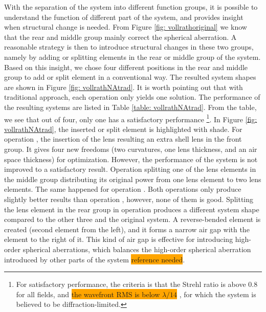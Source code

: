 With the separation of the system into different function groups, it is possible to understand the function of different part of the system, and provides insight when structural change is needed. From Figure \ref{fig: vollrathoriginal} we know that the rear and middle group mainly correct the spherical aberration. A reasonable strategy is then to introduce structural changes in these two groups, namely by adding or splitting elements in the rear or middle group of the system. Based on this insight, we chose four different positions in the rear and middle group to add or split element in a conventional way. The resulted system shapes are shown in Figure \ref{fig: vollrathNAtrad}. It is worth pointing out that with traditional approach, each operation only yields one solution. The performance of the resulting systems are listed in Table \ref{table: vollrathNAtrad}. From the table, we see that out of four, only one has a satisfactory performance \footnote{For satisfactory performance, the criteria is that the Strehl ratio is above 0.8 for all fields, and \colorbox{orange}{the wavefront RMS is below $\lambda/14$} \cite{patentvollrath}, for which the system is believed to be diffraction-limited.}. In Figure \ref{fig: vollrathNAtrad}, the inserted or split element is highlighted with shade. For operation , the insertion of the lens resulting an extra shell lens in the front group. It gives four new freedoms (two curvatures, one lens thickness, and an air space thickness) for optimization. However, the performance of the system is not improved to a satisfactory result. Operation  splitting one of the lens elements in the middle group distributing its original power from one lens element to two lens elements. The same happened for operation . Both operations only produce slightly better results than operation , however, none of them is good. Splitting the lens element in the rear group in operation  produces a different system shape compared to the other three and the original system. A reverse-bended element is created (second element from the left), and it forms a narrow air gap with the element to the right of it. This kind of air gap is effective for introducing high-order spherical aberrations, which balances the high-order spherical aberration introduced by other parts of the system \colorbox{orange}{reference needed}.


